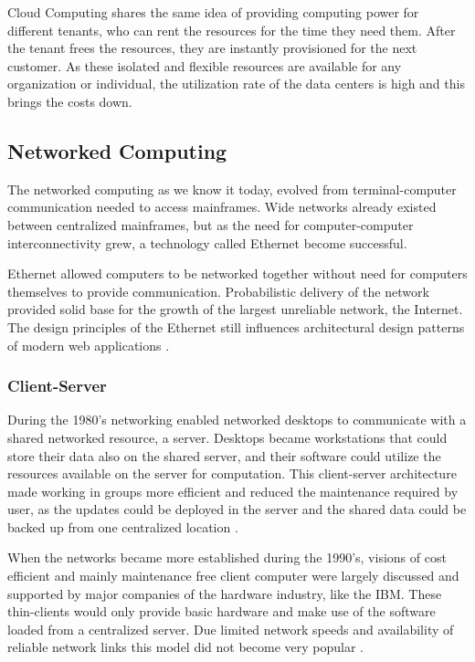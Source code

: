 \documentclass{tktltiki}
\begin{document}
Cloud Computing shares the same idea of providing computing power for different tenants, who can rent the resources for the time they need them.  After the tenant frees the resources, they are instantly provisioned for the next customer.  As these isolated and flexible resources are available for any organization or individual,  the utilization rate of the data centers is high and this brings the costs down. 
  


\subsection{Networked Computing}

The networked computing as we know it today, evolved from terminal-computer communication needed to access mainframes.  Wide networks already existed between centralized mainframes, but as the need for computer-computer interconnectivity grew, a technology called Ethernet become successful.

Ethernet allowed computers to be networked together without need for computers themselves to provide communication.  Probabilistic delivery of the network provided solid base for the growth of the largest unreliable network, the Internet.  The design principles of the Ethernet still influences architectural design patterns of modern web applications \cite{ethernet}.


\subsubsection{Client-Server}

During the 1980's networking enabled networked desktops to communicate with a shared networked resource, a server.  Desktops became workstations that could store their data also on the shared server, and their software could utilize the resources available on the server for computation.  This client-server architecture made working in groups more efficient and reduced the maintenance required by user, as the updates could be deployed in the server and the shared data could be backed up from one centralized location \cite{ClientServer96, CloudComputing}.

When the networks became more established during the 1990's, visions of cost efficient and mainly maintenance free client computer were largely discussed and supported by major companies of the hardware industry, like the IBM.  These thin-clients would only provide basic hardware and make use of the software loaded from a centralized server.  Due limited network speeds and availability of reliable network links this model did not become very popular \cite{InTheClouds07}.
\end{document}
